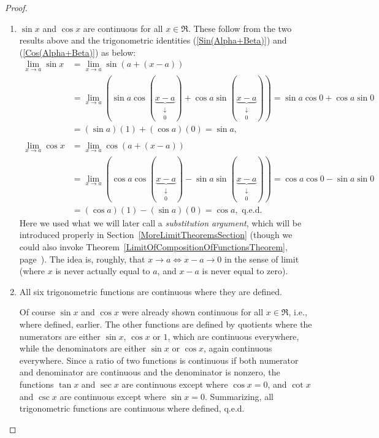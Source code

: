 \begin{proof}
\begin{enumerate}
\item $\sin x$ and $\cos x$ are continuous for all $x\in\Re$.
These follow from the two results above and the 
trigonometric identities (\ref{Sin(Alpha+Beta)}) and
(\ref{Cos(Alpha+Beta)}) as below:
\begin{align*}
\lim_{x\to a}\sin x
&=\lim_{x\to a}\sin(a+(x-a))\\
&=\lim_{x\to a}(\sin a \cos(\underbrace{x-a}_{\begin{array}{c}
\downarrow\\ 0\end{array}})+\cos a\sin(\underbrace{x-a}_{\begin{array}{c}
\downarrow\\ 0\end{array}}))
=\sin a \cos 0 + \cos a\sin 0 
\\&= (\sin a)(1)+(\cos a)(0)=\sin a,\\ \\
\lim_{x\to a}\cos x
&=\lim_{x\to a}\cos(a+(x-a))\\
&=\lim_{x\to a}(\cos a \cos(\underbrace{x-a}_{\begin{array}{c}
\downarrow\\ 0\end{array}})-\sin a\sin(\underbrace{x-a}_{\begin{array}{c}
\downarrow\\ 0\end{array}}))
=\cos a \cos 0 -\sin a\sin 0 \\&= (\cos a)(1)-(\sin a)(0)
=\cos a,\text{ q.e.d.}
\end{align*}
Here we used what we will later call a {\it substitution argument},
which will be introduced properly in 
Section~\ref{MoreLimitTheoremsSection} (though
we could also invoke Theorem~\ref{LimitOfCompositionOfFunctionsTheorem},
page~\pageref{LimitOfCompositionOfFunctionsTheorem}).  The idea is, roughly,
that $x\to a\iff x-a\to 0$ in the sense of limit (where $x$ is
never actually equal to $a$, and $x-a$ is never equal to zero).
\item All six trigonometric functions are continuous where 
they are defined.

Of course $\sin x$ and $\cos x$ were already shown continuous 
for all $x\in\Re$, i.e., where defined, earlier.  
The other functions are defined by quotients
where the numerators are either $\sin x$, $\cos x$ or
$1$, which are continuous everywhere,
while the denominators are either $\sin x$ or
$\cos x$, again continuous everywhere.  
Since a ratio of two functions is 
continuous if both numerator and denominator
are continuous and the denominator is nonzero,
the functions $\tan x$ and $\sec x$ are continuous
except where $\cos x=0$, and $\cot x$ and $\csc x$
are continuous except where $\sin x=0$.  Summarizing,
all trigonometric functions are continuous where defined, q.e.d.
\end{enumerate}
\end{proof}











